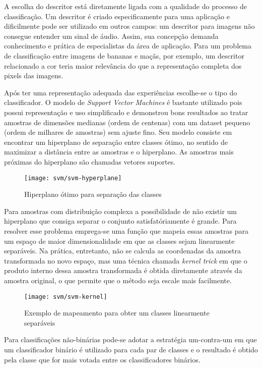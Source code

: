 A escolha do descritor está diretamente ligada com a qualidade do processo de classificação. Um descritor é criado especificamente para uma aplicação e dificilmente pode ser utilizado em outros campos: um descritor para imagens não consegue entender um sinal de áudio. Assim, sua concepção demanda conhecimento e prática de especialistas da área de aplicação. Para um problema de classificação entre imagens de bananas e maçãs, por exemplo, um descritor relacionado a cor teria maior relevância do que a representação completa dos pixels das imagens.

Após ter uma representação adequada das experiências escolhe-se o tipo do classificador. O modelo de \textit{Support Vector Machines} é bastante utilizado pois possui representação e uso simplificado e demonstrou bons resultados ao tratar amostras de dimensões medianas (ordem de centenas) com um dataset pequeno (ordem de milhares de amostras) sem ajuste fino. Seu modelo consiste em encontrar um hiperplano de separação entre classes ótimo, no sentido de maximizar a distância entre as amostras e o hiperplano. As amostras mais próximas do hiperplano são chamadas vetores suportes.

\begin{figure}[h]
\caption{Hiperplano ótimo para separação das classes}
\centering
\texttt{[image: svm/svm-hyperplane]}
\label{fig:svm-hyperplane}
\end{figure}

Para amostras com distribuição complexa a possibilidade de não existir um hiperplano que consiga separar o conjunto satisfatóriamente é grande. Para resolver esse problema emprega-se uma função que mapeia essas amostras para um espaço de maior dimensionalidade em que as classes sejam linearmente separáveis. Na prática, entretanto, não se calcula as coordenadas da amostra transformada no novo espaço, mas uma técnica chamada \textit{kernel trick} em que o produto interno dessa amostra transformada é obtida diretamente através da amostra original, o que permite que o método seja escale mais facilmente.

\begin{figure}[h]
\caption{Exemplo de mapeamento para obter um classes linearmente separáveis}
\centering
\texttt{[image: svm/svm-kernel]}
\label{fig:svm-kernel}
\end{figure}

Para classificações não-binárias pode-se adotar a estratégia um-contra-um em que um classificador binário é utilizado para cada par de classes e o resultado é obtido pela classe que for mais votada entre os classificadores binários.

